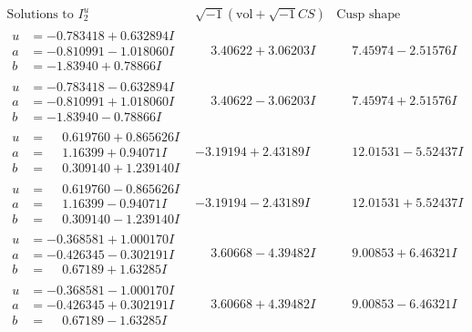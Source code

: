 \documentclass[1p]{elsarticle_modified}
\theoremstyle{definition}
\newcommand{\I}{\sqrt{-1}}
\begin{document}
$$\begin{array}{c|c|c}  
\text{Solutions to }I^u_{2}& \I (\text{vol} + \sqrt{-1}CS) & \text{Cusp shape}\\
 \hline 
\begin{aligned}
u &= -0.783418 + 0.632894 I \\
a &= -0.810991 - 1.018060 I \\
b &= -1.83940 + 0.78866 I\end{aligned}
 & \phantom{-}3.40622 + 3.06203 I & \phantom{-}7.45974 - 2.51576 I \\ \hline\begin{aligned}
u &= -0.783418 - 0.632894 I \\
a &= -0.810991 + 1.018060 I \\
b &= -1.83940 - 0.78866 I\end{aligned}
 & \phantom{-}3.40622 - 3.06203 I & \phantom{-}7.45974 + 2.51576 I \\ \hline\begin{aligned}
u &= \phantom{-}0.619760 + 0.865626 I \\
a &= \phantom{-}1.16399 + 0.94071 I \\
b &= \phantom{-}0.309140 + 1.239140 I\end{aligned}
 & -3.19194 + 2.43189 I & \phantom{-}12.01531 - 5.52437 I \\ \hline\begin{aligned}
u &= \phantom{-}0.619760 - 0.865626 I \\
a &= \phantom{-}1.16399 - 0.94071 I \\
b &= \phantom{-}0.309140 - 1.239140 I\end{aligned}
 & -3.19194 - 2.43189 I & \phantom{-}12.01531 + 5.52437 I \\ \hline\begin{aligned}
u &= -0.368581 + 1.000170 I \\
a &= -0.426345 - 0.302191 I \\
b &= \phantom{-}0.67189 + 1.63285 I\end{aligned}
 & \phantom{-}3.60668 - 4.39482 I & \phantom{-}9.00853 + 6.46321 I \\ \hline\begin{aligned}
u &= -0.368581 - 1.000170 I \\
a &= -0.426345 + 0.302191 I \\
b &= \phantom{-}0.67189 - 1.63285 I\end{aligned}
 & \phantom{-}3.60668 + 4.39482 I & \phantom{-}9.00853 - 6.46321 I \\ \hline\begin{aligned}

\end{aligned}
\end{array}$$
\end{document}
